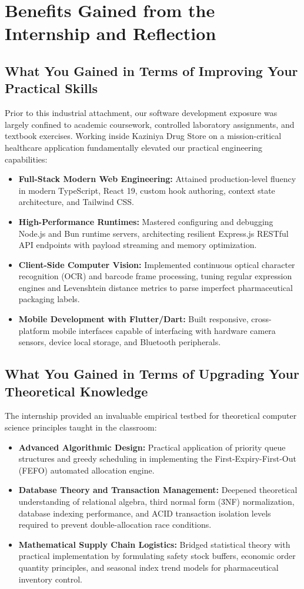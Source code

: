 \chapter{Benefits Gained from the Internship and Reflection}
\label{chap:benefits_reflection}

\section{What You Gained in Terms of Improving Your Practical Skills}
Prior to this industrial attachment, our software development exposure was largely confined to academic coursework, controlled laboratory assignments, and textbook exercises. Working inside Kaziniya Drug Store on a mission-critical healthcare application fundamentally elevated our practical engineering capabilities:
\begin{itemize}
    \item \textbf{Full-Stack Modern Web Engineering:} Attained production-level fluency in modern TypeScript, React 19, custom hook authoring, context state architecture, and Tailwind CSS.
    \item \textbf{High-Performance Runtimes:} Mastered configuring and debugging Node.js and Bun runtime servers, architecting resilient Express.js RESTful API endpoints with payload streaming and memory optimization.
    \item \textbf{Client-Side Computer Vision:} Implemented continuous optical character recognition (OCR) and barcode frame processing, tuning regular expression engines and Levenshtein distance metrics to parse imperfect pharmaceutical packaging labels.
    \item \textbf{Mobile Development with Flutter/Dart:} Built responsive, cross-platform mobile interfaces capable of interfacing with hardware camera sensors, device local storage, and Bluetooth peripherals.
\end{itemize}

\section{What You Gained in Terms of Upgrading Your Theoretical Knowledge}
The internship provided an invaluable empirical testbed for theoretical computer science principles taught in the classroom:
\begin{itemize}
    \item \textbf{Advanced Algorithmic Design:} Practical application of priority queue structures and greedy scheduling in implementing the First-Expiry-First-Out (FEFO) automated allocation engine.
    \item \textbf{Database Theory and Transaction Management:} Deepened theoretical understanding of relational algebra, third normal form (3NF) normalization, database indexing performance, and ACID transaction isolation levels required to prevent double-allocation race conditions.
    \item \textbf{Mathematical Supply Chain Logistics:} Bridged statistical theory with practical implementation by formulating safety stock buffers, economic order quantity principles, and seasonal index trend models for pharmaceutical inventory control.
\end{itemize}

